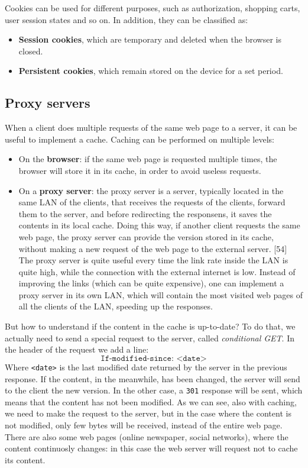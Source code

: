 \noindent Cookies can be used for different purposes, such as authorization, shopping carts, user session states and so on. In addition, they can be classified as:
\begin{itemize}
    \item \textbf{Session cookies}, which are temporary and deleted when the browser is closed.
    \item \textbf{Persistent cookies}, which remain stored on the device for a set period.
\end{itemize}

\subsection{Proxy servers}
When a client does multiple requests of the same web page to a server, it can be useful to implement a cache. Caching can be performed on multiple levels:
\begin{itemize}
    \item On the \textbf{browser}: if the same web page is requested multiple times, the browser will store it in its cache, in order to avoid useless requests.
    \item On a \textbf{proxy server}: the proxy server is a server, typically located in the same LAN of the clients, that receives the requests of the clients, forward them to the server, and before redirecting the responsens, it saves the contents in its local cache. Doing this way, if another client requests the same web page, the proxy server can provide the version stored in its cache, without making a new request of the web page to the external server. [54]
    The proxy server is quite useful every time the link rate inside the LAN is quite high, while the connection with the external internet is low. Instead of improving the links (which can be quite expensive), one can implement a proxy server in its own LAN, which will contain the most visited web pages of all the clients of the LAN, speeding up the responses.
\end{itemize}

\noindent But how to understand if the content in the cache is up-to-date? To do that, we actually need to send a special request to the server, called \textit{conditional GET}. In the header of the request we add a line:
\[\texttt{If-modified-since: <date>}\]
Where \texttt{<date>} is the last modified date returned by the server in the previous response. If the content, in the meanwhile, has been changed, the server will send to the client the new version. In the other case, a \texttt{301} response will be sent, which means that the content has not been modified. As we can see, also with caching, we need to make the request to the server, but in the case where the content is not modified, only few bytes will be received, instead of the entire web page. There are also some web pages (online newspaper, social networks), where the content continuosly changes: in this case the web server will request not to cache its content.

